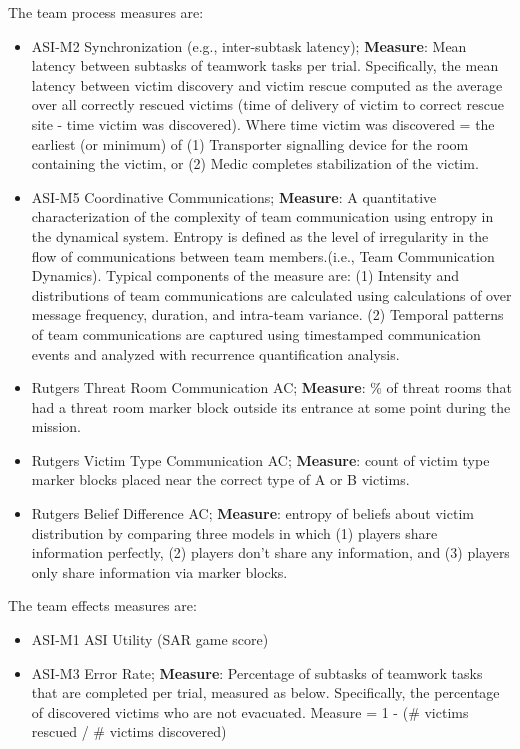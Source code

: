 The team process measures are:
\begin{itemize}
    \item
    ASI-M2 Synchronization (e.g., inter-subtask latency); \textbf{Measure}: Mean latency
    between subtasks of teamwork tasks per trial. Specifically, the mean latency
    between victim discovery and victim rescue computed as the average over all
    correctly rescued victims (time of delivery of victim to correct rescue site
    - time victim was discovered). Where time victim was discovered = the
    earliest (or minimum) of (1) Transporter signalling device for the room
    containing the victim, or (2) Medic completes stabilization of the victim.
 
    \item
    ASI-M5 Coordinative Communications; \textbf{Measure}: A quantitative characterization
    of the complexity of team communication using entropy in the dynamical
    system. Entropy is defined as the level of irregularity in the flow of
    communications between team members.(i.e., Team Communication Dynamics).
    Typical components of the measure are: (1) Intensity and distributions of
    team communications are calculated using calculations of over message
    frequency, duration, and intra-team variance. (2) Temporal patterns of team
    communications are captured using timestamped communication events and
    analyzed with recurrence quantification analysis.

    \item
    Rutgers Threat Room Communication AC; \textbf{Measure}: \% of threat rooms that had a
    threat room marker block outside its entrance at some point during the
    mission.  

    \item
    Rutgers Victim Type Communication AC; \textbf{Measure}: count of victim
    type marker blocks placed near the correct type of A or B victims.
    
    \item
    Rutgers Belief Difference AC; \textbf{Measure}: entropy of beliefs about victim
    distribution by comparing three models in which (1) players share
    information perfectly, (2) players don't share any information, and (3)
    players only share information via marker blocks.  
\end{itemize}

The team effects measures are: 

\begin{itemize}
    \item
    ASI-M1 ASI Utility (SAR game score) 
    \item

    ASI-M3 Error Rate; \textbf{Measure}: Percentage of
    subtasks of teamwork tasks that are completed per trial, measured as below.
    Specifically, the percentage of discovered victims who are not evacuated.
    Measure = 1 - (\# victims rescued / \# victims discovered)
\end{itemize}

